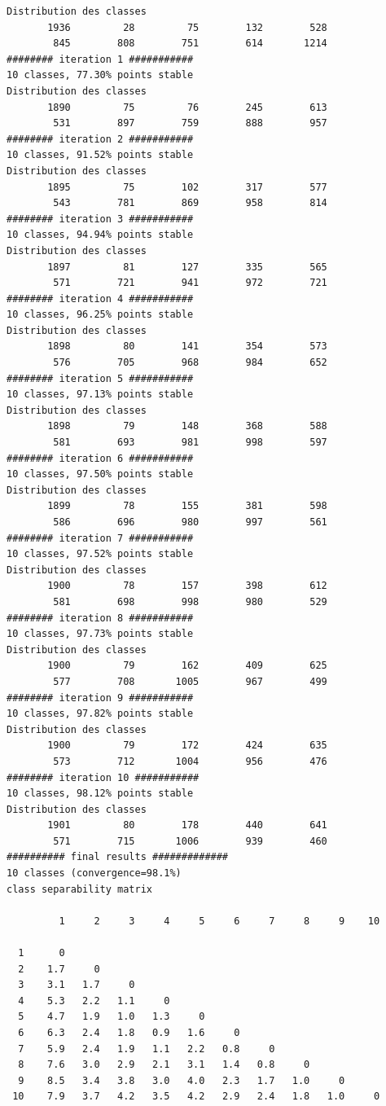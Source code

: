 \documentclass[environments,article,submit,pdftex,moreauthors]{Definitions/mdpi}
\begin{document}
\begin{scriptsize}
\begin{verbatim}
Distribution des classes
       1936         28         75        132        528
        845        808        751        614       1214
######## iteration 1 ###########
10 classes, 77.30% points stable
Distribution des classes
       1890         75         76        245        613
        531        897        759        888        957
######## iteration 2 ###########
10 classes, 91.52% points stable
Distribution des classes
       1895         75        102        317        577
        543        781        869        958        814
######## iteration 3 ###########
10 classes, 94.94% points stable
Distribution des classes
       1897         81        127        335        565
        571        721        941        972        721
######## iteration 4 ###########
10 classes, 96.25% points stable
Distribution des classes
       1898         80        141        354        573
        576        705        968        984        652
######## iteration 5 ###########
10 classes, 97.13% points stable
Distribution des classes
       1898         79        148        368        588
        581        693        981        998        597
######## iteration 6 ###########
10 classes, 97.50% points stable
Distribution des classes
       1899         78        155        381        598
        586        696        980        997        561
######## iteration 7 ###########
10 classes, 97.52% points stable
Distribution des classes
       1900         78        157        398        612
        581        698        998        980        529
######## iteration 8 ###########
10 classes, 97.73% points stable
Distribution des classes
       1900         79        162        409        625
        577        708       1005        967        499
######## iteration 9 ###########
10 classes, 97.82% points stable
Distribution des classes
       1900         79        172        424        635
        573        712       1004        956        476
######## iteration 10 ###########
10 classes, 98.12% points stable
Distribution des classes
       1901         80        178        440        641
        571        715       1006        939        460
########## final results #############
10 classes (convergence=98.1%)
class separability matrix

         1     2     3     4     5     6     7     8     9    10

  1      0
  2    1.7     0
  3    3.1   1.7     0
  4    5.3   2.2   1.1     0
  5    4.7   1.9   1.0   1.3     0
  6    6.3   2.4   1.8   0.9   1.6     0
  7    5.9   2.4   1.9   1.1   2.2   0.8     0
  8    7.6   3.0   2.9   2.1   3.1   1.4   0.8     0
  9    8.5   3.4   3.8   3.0   4.0   2.3   1.7   1.0     0
 10    7.9   3.7   4.2   3.5   4.2   2.9   2.4   1.8   1.0     0


\end{verbatim}
\end{scriptsize}
\end{document}
